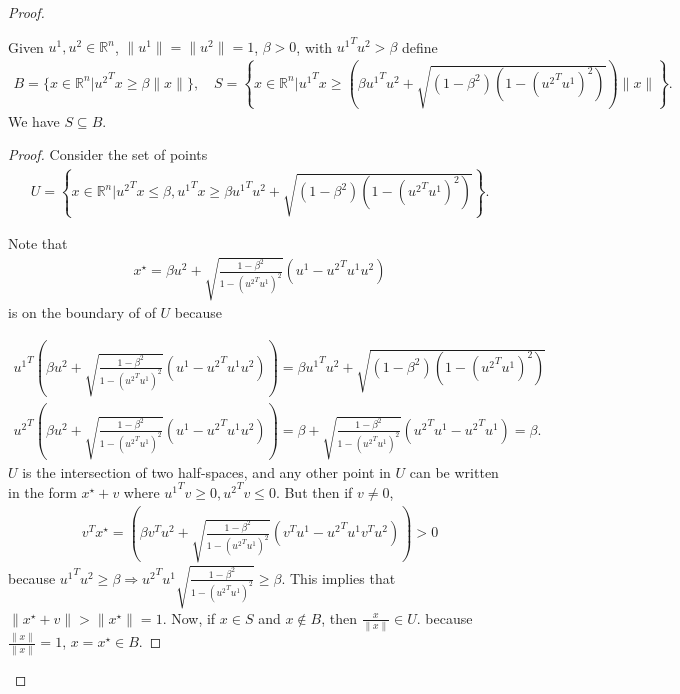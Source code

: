 \begin{proof}
\begin{theorem}
Given $u^1, u^2 \in \mathbb R^n$, $\|u^1\| = \|u^2\|= 1$, $\beta >0$, with ${u^1}^Tu^2 > \beta$ define
\begin{align*}
B = \{x\in\mathbb R^n | {u^2}^Tx \ge \beta\|x\|\}, \quad
S = \left\{x\in\mathbb R^n \bigg| {u^1}^Tx \ge \left(\beta {u^1}^Tu^2 + \sqrt{(1 - \beta^2)\left(1 - ({u^2}^Tu^1)^2\right)}\right)\|x\| \right\}. 
\end{align*}
We have $S \subseteq B$.
\end{theorem}


\begin{proof}

Consider the set of points 
\begin{align*}
U = \left\{x \in \mathbb R^n | {u^2}^Tx \le \beta, {u^1}^Tx \ge \beta {u^1}^Tu^2 + \sqrt{(1 - \beta^2)\left(1 - ({u^2}^Tu^1)^2\right)} \right\}.
\end{align*}

Note that
\begin{align*}
x^{\star} = \beta u^2 + \sqrt{\frac{1 - \beta^2}{1 - ({u^2}^Tu^1)^2}} (u^1 - {u^2}^Tu^1 u^2 )
\end{align*}
is on the boundary of of $U$ because

\begin{align*}
{u^1}^T\left(\beta u^2 + \sqrt{\frac{1 - \beta^2}{1 - ({u^2}^Tu^1)^2}} (u^1 - {u^2}^Tu^1 u^2 )\right) = 
\beta {u^1}^Tu^2 + \sqrt{(1 - \beta^2)\left(1 - ({u^2}^Tu^1)^2\right)} \\
{u^2}^T\left(\beta u^2 + \sqrt{\frac{1 - \beta^2}{1 - ({u^2}^Tu^1)^2}} (u^1 - {u^2}^Tu^1 u^2 )\right) = 
\beta + \sqrt{\frac{1 - \beta^2}{1 - ({u^2}^Tu^1)^2}} ({u^2}^Tu^1 - {u^2}^Tu^1 ) = \beta.
\end{align*}
$U$ is the intersection of two half-spaces, and any other point in $U$ can be written in the form $x^{\star} + v$ where ${u^1}^Tv \ge 0, {u^2}^Tv \le 0$.
But then if $v \ne 0$,
\begin{align*}
{v}^Tx^{\star} = 
\left(\beta {v}^Tu^2 + \sqrt{\frac{1 - \beta^2}{1 - ({u^2}^Tu^1)^2}} ({v}^Tu^1 - {u^2}^Tu^1 {v}^Tu^2 )\right) > 0
\end{align*}
because ${u^1}^Tu^2 \ge \beta \Longrightarrow {u^2}^Tu^1\sqrt{\frac{1 - \beta^2}{1 - ({u^2}^Tu^1)^2}} \ge \beta$.
This implies that $\|x^{\star} + v\| > \|x^{\star}\| = 1$.
Now, if $x \in S$ and $x \not \in B$, then $\frac{x}{\|x\|} \in U$.
because $\frac{\|x\|}{\|x\|} = 1$, $x = x^{\star} \in B$.































\end{proof}
\end{proof}
